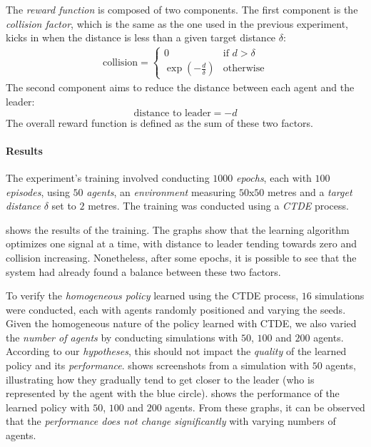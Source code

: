 \documentclass[12pt,a4paper,openright,twoside]{book}
\begin{document}
The \emph{reward function} is composed of two components. The first component is the \emph{collision factor},
    which is the same as the one used in the previous experiment, kicks in when the distance is less than 
    a given target distance $\delta$:
    \begin{equation}
        \label{eq:ftl-collision-factor-eq}
        \begin{split}
            \text{collision} = \begin{cases}
                0 & \text{if } d > \delta \\
                \exp\left(-\frac{d}{\delta}\right) & \text{otherwise}
            \end{cases}
        \end{split}
    \end{equation}
    The second component aims to reduce the distance between each agent and the leader:
    \begin{equation}
        \label{eq:ftl-distance-factor-eq}
        \text{distance to leader} = -d
    \end{equation}
    The overall reward function is defined as the sum of these two factors.

\paragraph{Results}
The experiment's training involved conducting $1000$ \emph{epochs}, each with $100$ \emph{episodes}, 
    using $50$ \emph{agents}, an \emph{environment} measuring $50$x$50$ metres and a \emph{target distance} $\delta$ set to $2$ metres.
    The training was conducted using a \emph{CTDE} process.

 shows the results of the training. The graphs show that the learning algorithm optimizes one signal 
    at a time, with distance to leader tending towards zero and collision increasing. Nonetheless, after some epochs, 
    it is possible to see that the system had already found a balance between these two factors.

To verify the \emph{homogeneous policy} learned using the CTDE process, $16$ simulations were conducted, each with agents randomly
    positioned and varying the seeds. Given the homogeneous nature of the policy learned with CTDE, we also varied the 
    \emph{number of agents} by conducting simulations with $50$, $100$ and $200$ agents. According to our \emph{hypotheses}, this
    should not impact the \emph{quality} of the learned policy and its \emph{performance}.  shows 
    screenshots from a simulation with $50$ agents, illustrating how they gradually tend to get closer to the leader 
    (who is represented by the agent with the blue circle).  shows the performance of the learned policy with $50$,
    $100$ and $200$ agents. From these graphs, it can be observed that the \emph{performance does not change significantly} with varying
    numbers of agents.
\end{document}
